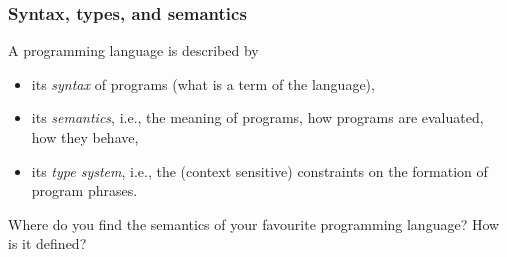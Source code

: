 \begin{frame}
  \frametitle{Syntax, types, and semantics}
  A programming language is described by
  \begin{itemize}
  \item its \emph{syntax} of programs (what is a term of the language),
  \item its \emph{semantics}, i.e., the meaning of programs, how
    programs are evaluated, how they behave,
  \item its \emph{type system}, i.e., the (context sensitive)
    constraints on the formation of program phrases.
  \end{itemize}

  \bigskip Where do you find the semantics of your favourite programming
  language? How is it defined?
\end{frame}












